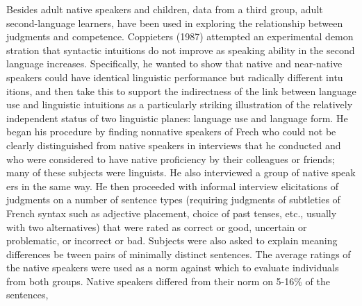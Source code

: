 \begin{styleTextbody}
Besides adult native speakers and children, data from a third group, adult second-language learners, have been used in exploring the relationship between judgments and competence. Coppieters (1987) attempted an experimental demon\- stration that syntactic intuitions do not improve as speaking ability in the second language increases. Specifically, he wanted to show that native and near-native speakers could have identical linguistic performance but radically different intu\- itions, and then take this to support the indirectness of the link between language use and linguistic intuitions as {\textquotedbl}a particularly striking illustration of the relatively independent status of two linguistic planes: language use and language form.{\textquotedbl} He began his procedure by finding nonnative speakers of Frech who could not be clearly distinguished from native speakers in interviews that he conducted and who were considered to have native proficiency by their colleagues or friends; many of these subjects were linguists. He also interviewed a group of native speak\- ers in the same way. He then proceeded with informal interview elicitations of judgments on a number of sentence types (requiring judgments of subtleties of French syntax such as adjective placement, choice of past tenses, etc., usually with two alternatives) that were rated as {\textquotedbl}correct or good,{\textquotedbl} {\textquotedbl}uncertain or problematic,{\textquotedbl} or {\textquotedbl}incorrect or bad.{\textquotedbl} Subjects were also asked to explain meaning differences be\- tween pairs of minimally distinct sentences. The average ratings of the native speakers were used as a norm against which to evaluate individuals from both groups. Native speakers differed from their norm on 5-16\% of the sentences,
\end{styleTextbody}


